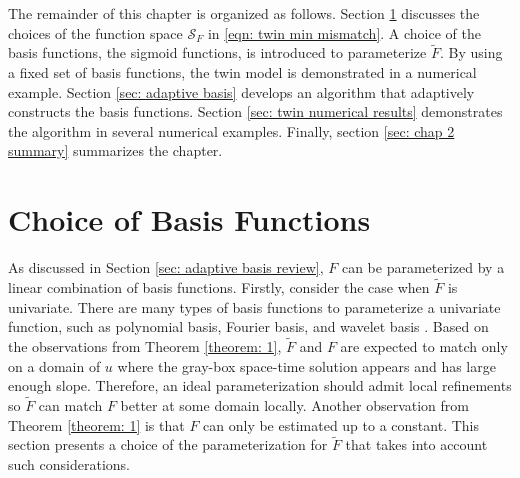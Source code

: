 The remainder of this chapter is organized as follows.
Section \ref{sec: flux param} discusses the choices of the function space $\mathcal{S}_F$
in \eqref{eqn: twin min mismatch}.
A choice of the basis functions, the sigmoid functions, 
is introduced to parameterize $\tilde{F}$. By using a fixed set of basis functions, the 
twin model is demonstrated in a numerical example.
Section \ref{sec: adaptive basis} develops an algorithm that adaptively constructs the
basis functions.
Section \ref{sec: twin numerical results} demonstrates the algorithm in several numerical examples.
Finally, section \ref{sec: chap 2 summary} summarizes the chapter.\\


\section{Choice of Basis Functions}
\label{sec: flux param}
As discussed in Section \ref{sec: adaptive basis review}, 
$F$ can be parameterized by a linear combination of basis functions.
Firstly, consider the case when $\tilde{F}$ is univariate. 
There are many types of basis
functions to parameterize a univariate function, such as polynomial basis, Fourier basis, and
wavelet basis \cite{wavelet mallat}. 
Based on the observations from Theorem \ref{theorem: 1}, $\tilde{F}$ and $F$
are expected to match only on a domain of $u$ 
where the gray-box space-time solution appears and has large enough slope.
Therefore, an ideal parameterization should 
admit local refinements so $\tilde{F}$ can match $F$ better at some domain locally.
Another observation from Theorem \ref{theorem: 1} is that $F$ can only be estimated up to 
a constant.
This section presents a choice of the parameterization for $\tilde{F}$ that takes into account
such considerations.\\

